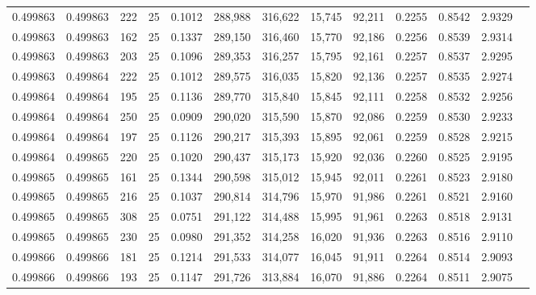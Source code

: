 \begin{tabular}{rrrrrrrrrrrrr}
0.499863 & 0.499863 &   222 &  25 &                                     0.1012 & 288,988 & 316,622 &  15,745 &  92,211 & 0.2255 & 0.8542 & 2.9329 \\
0.499863 & 0.499863 &   162 &  25 &                                     0.1337 & 289,150 & 316,460 &  15,770 &  92,186 & 0.2256 & 0.8539 & 2.9314 \\
0.499863 & 0.499863 &   203 &  25 &                                     0.1096 & 289,353 & 316,257 &  15,795 &  92,161 & 0.2257 & 0.8537 & 2.9295 \\
0.499863 & 0.499864 &   222 &  25 &                                     0.1012 & 289,575 & 316,035 &  15,820 &  92,136 & 0.2257 & 0.8535 & 2.9274 \\
0.499864 & 0.499864 &   195 &  25 &                                     0.1136 & 289,770 & 315,840 &  15,845 &  92,111 & 0.2258 & 0.8532 & 2.9256 \\
0.499864 & 0.499864 &   250 &  25 &                                     0.0909 & 290,020 & 315,590 &  15,870 &  92,086 & 0.2259 & 0.8530 & 2.9233 \\
0.499864 & 0.499864 &   197 &  25 &                                     0.1126 & 290,217 & 315,393 &  15,895 &  92,061 & 0.2259 & 0.8528 & 2.9215 \\
0.499864 & 0.499865 &   220 &  25 &                                     0.1020 & 290,437 & 315,173 &  15,920 &  92,036 & 0.2260 & 0.8525 & 2.9195 \\
0.499865 & 0.499865 &   161 &  25 &                                     0.1344 & 290,598 & 315,012 &  15,945 &  92,011 & 0.2261 & 0.8523 & 2.9180 \\
0.499865 & 0.499865 &   216 &  25 &                                     0.1037 & 290,814 & 314,796 &  15,970 &  91,986 & 0.2261 & 0.8521 & 2.9160 \\
0.499865 & 0.499865 &   308 &  25 &                                     0.0751 & 291,122 & 314,488 &  15,995 &  91,961 & 0.2263 & 0.8518 & 2.9131 \\
0.499865 & 0.499865 &   230 &  25 &                                     0.0980 & 291,352 & 314,258 &  16,020 &  91,936 & 0.2263 & 0.8516 & 2.9110 \\
0.499866 & 0.499866 &   181 &  25 &                                     0.1214 & 291,533 & 314,077 &  16,045 &  91,911 & 0.2264 & 0.8514 & 2.9093 \\
0.499866 & 0.499866 &   193 &  25 &                                     0.1147 & 291,726 & 313,884 &  16,070 &  91,886 & 0.2264 & 0.8511 & 2.9075 \\

\end{tabular}
